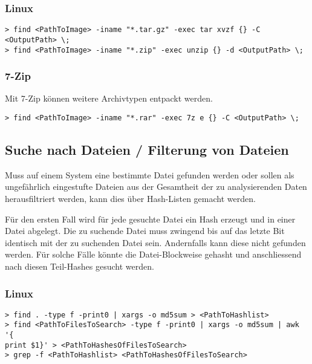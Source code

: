 \subsubsection{Linux} 
\begin{lstlisting}
> find <PathToImage> -iname "*.tar.gz" -exec tar xvzf {} -C <OutputPath> \;
> find <PathToImage> -iname "*.zip" -exec unzip {} -d <OutputPath> \;
\end{lstlisting}

\subsubsection{7-Zip}
Mit 7-Zip können weitere Archivtypen entpackt werden.

\begin{lstlisting}
> find <PathToImage> -iname "*.rar" -exec 7z e {} -C <OutputPath> \;
\end{lstlisting}

\subsection{Suche nach Dateien / Filterung von Dateien}
Muss auf einem System eine bestimmte Datei gefunden werden oder sollen als ungefährlich eingestufte Dateien aus der Gesamtheit der zu analysierenden Daten herausfiltriert werden, kann dies über Hash-Listen gemacht werden.

Für den ersten Fall wird für jede gesuchte Datei ein Hash erzeugt und in einer Datei abgelegt. Die zu suchende Datei muss zwingend bis auf das letzte Bit identisch mit der zu suchenden Datei sein. Andernfalls kann diese nicht gefunden werden. Für solche Fälle könnte die Datei-Blockweise gehasht und anschliessend nach diesen Teil-Hashes gesucht werden.

\subsubsection{Linux}
\begin{lstlisting}
> find . -type f -print0 | xargs -o md5sum > <PathToHashlist>
> find <PathToFilesToSearch> -type f -print0 | xargs -o md5sum | awk '{
print $1}' > <PathToHashesOfFilesToSearch>
> grep -f <PathToHashlist> <PathToHashesOfFilesToSearch>
\end{lstlisting}



